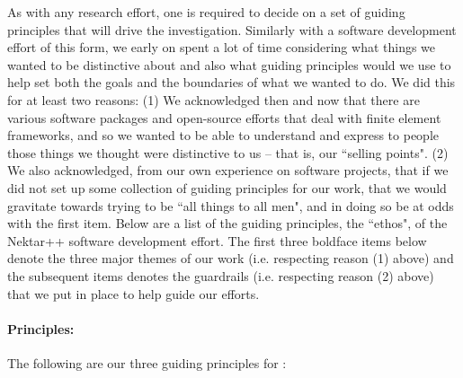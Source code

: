 As with any research effort, one is required to decide on a set of guiding principles that will 
drive the investigation.  Similarly with a software development effort of this form, we early on 
spent a lot of time considering what things we wanted to be distinctive about {\nek} and also
what guiding principles would we use to help set both the goals and the boundaries of what
we wanted to do.  We did this for at least two reasons:  (1) We acknowledged then and now that
there are various software packages and open-source efforts that deal with finite element frameworks,
and so we wanted to be able to understand and express to people those things we thought were
distinctive to us -- that is, our ``selling points".  (2) We also acknowledged, from our own experience
on software projects, that if we did not set up some collection of guiding principles for our work, that
we would gravitate towards trying to be ``all things to all men", and in doing so be at odds with the
first item.  Below are a list of the guiding principles, the ``ethos", of the Nektar++ software development
effort.  The first three boldface items below denote the three major themes of our work (i.e. respecting reason (1) above) and the
subsequent items denotes the guardrails (i.e. respecting reason (2) above) that 
we put in place to help guide our efforts.

\paragraph{Principles:}  The following are our three guiding principles for {\nek}:

